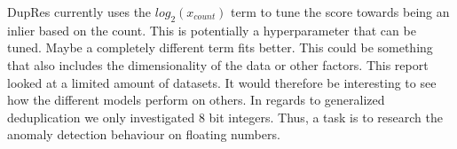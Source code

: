 DupRes currently uses the $log_2(x_{count})$ term to tune the score towards being an inlier based on the count. This is potentially a hyperparameter that can be tuned. Maybe a completely different term fits better. This could be something that also includes the dimensionality of the data or other factors. This report looked at a limited amount of datasets. It would therefore be interesting to see how the different models perform on others. In regards to generalized deduplication we only investigated 8 bit integers. Thus, a task is to research the anomaly detection behaviour on floating numbers.      